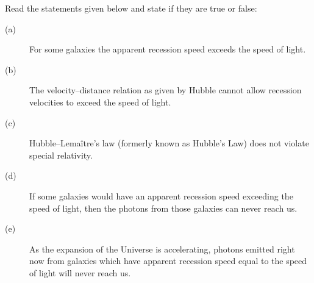 Read the statements given below and state if they are true or false:

\begin{description}
\item[(a)] For some galaxies the apparent recession speed exceeds the speed of
  light.
\item[(b)] The velocity--distance relation as given by Hubble cannot allow
  recession velocities to exceed the speed of light.
\item[(c)] Hubble--Lema\^itre's law (formerly known as Hubble's Law) does not
  violate special relativity.
\item[(d)] If some galaxies would have an apparent recession speed exceeding
  the speed of light, then the photons from those galaxies can never reach us.
\item[(e)] As the expansion of the Universe is accelerating, photons emitted
  right now from galaxies which have apparent recession speed equal to the
  speed of light will never reach us.
\end{description}

